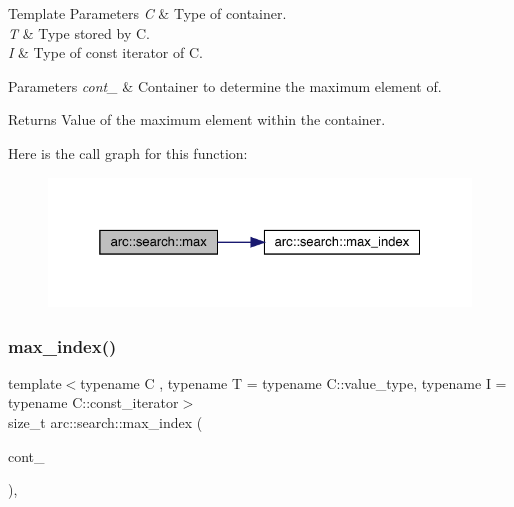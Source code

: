 \begin{DoxyTemplParams}{Template Parameters}
{\em C} & Type of container. \\
\hline
{\em T} & Type stored by C. \\
\hline
{\em I} & Type of const iterator of C.\\
\hline
\end{DoxyTemplParams}

\begin{DoxyParams}{Parameters}
{\em cont\+\_\+} & Container to determine the maximum element of.\\
\hline
\end{DoxyParams}
\begin{DoxyReturn}{Returns}
Value of the maximum element within the container. 
\end{DoxyReturn}
Here is the call graph for this function\+:\nopagebreak
\begin{figure}[H]
\begin{center}
\leavevmode
\includegraphics[width=325pt]{namespacearc_1_1search_ab5608d27962c637137d2c243213fa366_cgraph}
\end{center}
\end{figure}
\mbox{\label{namespacearc_1_1search_aac33af22b716309501eaa7f5a10cc1d0}} 
\subsubsection{\texorpdfstring{max\+\_\+index()}{max\_index()}}
{\footnotesize\ttfamily template$<$typename C , typename T  = typename C\+::value\+\_\+type, typename I  = typename C\+::const\+\_\+iterator$>$ \\
size\+\_\+t arc\+::search\+::max\+\_\+index (\begin{DoxyParamCaption}\item[{const C \&}]{cont\+\_\+ }\end{DoxyParamCaption})\hspace{0.3cm}{\ttfamily [inline]}, {\ttfamily [noexcept]}}

